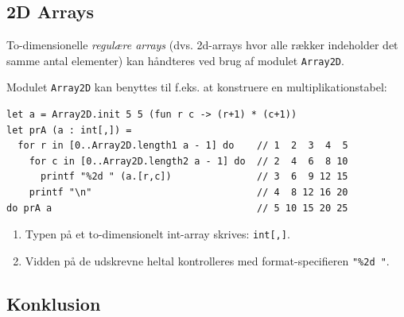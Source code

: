 \documentclass[rgb]{beamer}
\begin{document}
\subsection{2D Arrays}

\begin{frame}[fragile]
\begin{footnotesize}
\vspace{1ex}

To-dimensionelle \emph{regulære arrays} (dvs. 2d-arrays hvor alle
rækker indeholder \hspace{2cm} det samme antal elementer) kan håndteres ved brug af
modulet \lstinline{Array2D}.

\vspace{1ex}

Modulet \lstinline{Array2D} kan benyttes til f.eks. at konstruere
en multiplikationstabel:

\vspace{1ex}

\begin{lstlisting}[numbers=none,frame=none]
let a = Array2D.init 5 5 (fun r c -> (r+1) * (c+1))
let prA (a : int[,]) =
  for r in [0..Array2D.length1 a - 1] do    // 1  2  3  4  5
    for c in [0..Array2D.length2 a - 1] do  // 2  4  6  8 10
      printf "%2d " (a.[r,c])               // 3  6  9 12 15
    printf "\n"                             // 4  8 12 16 20
do prA a                                    // 5 10 15 20 25
\end{lstlisting}

\vspace{1ex}

\begin{enumerate}
\item Typen på et to-dimensionelt int-array skrives: \lstinline{int[,]}.
\item Vidden på de udskrevne heltal kontrolleres med format-specifieren \lstinline{"%2d "}.
\end{enumerate}
\end{footnotesize}
\end{frame}

\subsection*{Konklusion}
\begin{frame}[fragile]

  \vspace{3mm}
  \tableofcontents
\end{frame}
\end{document}
